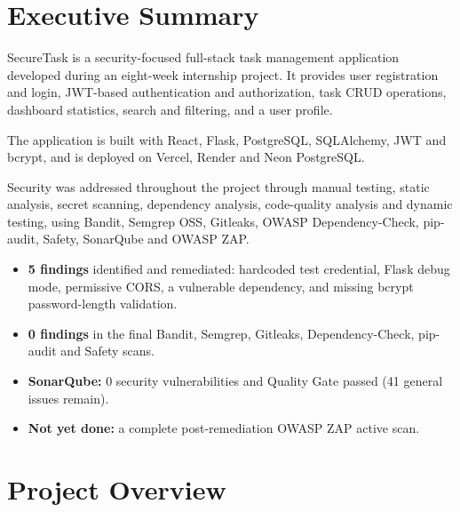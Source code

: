 \documentclass[11pt,a4paper]{article}
\begin{document}
\tableofcontents
\clearpage
\listoffigures
\clearpage
{}

\section{Executive Summary}

SecureTask is a security-focused full-stack task management application developed during an eight-week internship project. It provides user registration and login, JWT-based authentication and authorization, task CRUD operations, dashboard statistics, search and filtering, and a user profile.

The application is built with React, Flask, PostgreSQL, SQLAlchemy, JWT and bcrypt, and is deployed on Vercel, Render and Neon PostgreSQL.

Security was addressed throughout the project through manual testing, static analysis, secret scanning, dependency analysis, code-quality analysis and dynamic testing, using Bandit, Semgrep OSS, Gitleaks, OWASP Dependency-Check, pip-audit, Safety, SonarQube and OWASP ZAP.

\begin{keybox}
\begin{itemize}[leftmargin=*]
\item \textbf{5 findings} identified and remediated: hardcoded test credential, Flask debug mode, permissive CORS, a vulnerable dependency, and missing bcrypt password-length validation.
\item \textbf{0 findings} in the final Bandit, Semgrep, Gitleaks, Dependency-Check, pip-audit and Safety scans.
\item \textbf{SonarQube:} 0 security vulnerabilities and Quality Gate passed (41 general issues remain).
\item \textbf{Not yet done:} a complete post-remediation OWASP ZAP active scan.
\end{itemize}
\end{keybox}

\section{Project Overview}
\end{document}

